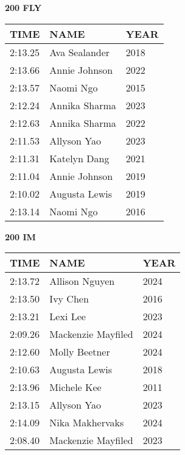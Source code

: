 \begin{table}[H]
\centering
\begin{minipage}[t]{0.48\textwidth}
\centering
\textbf{200 FLY}\\[0.1cm]
\begin{tabular}{@{}p{1.8cm}p{2.8cm}p{1.2cm}@{}}
\hline
    \textbf{TIME} & \textbf{NAME} & \textbf{YEAR} \\
\hline
    2:13.25 & Ava Sealander & 2018 \\
    2:13.66 & Annie Johnson & 2022 \\
    2:13.57 & Naomi Ngo & 2015 \\
    2:12.24 & Annika Sharma & 2023 \\
    2:12.63 & Annika Sharma & 2022 \\
    2:11.53 & Allyson Yao & 2023 \\
    2:11.31 & Katelyn Dang & 2021 \\
    2:11.04 & Annie Johnson & 2019 \\
    2:10.02 & Augusta Lewis & 2019 \\
    2:13.14 & Naomi Ngo & 2016 \\
\hline
\end{tabular}
\end{minipage}\hfill
\begin{minipage}[t]{0.48\textwidth}
\centering
\textbf{200 IM}\\[0.1cm]
\begin{tabular}{@{}p{1.8cm}p{2.8cm}p{1.2cm}@{}}
\hline
    \textbf{TIME} & \textbf{NAME} & \textbf{YEAR} \\
\hline
    2:13.72 & Allison Nguyen & 2024 \\
    2:13.50 & Ivy Chen & 2016 \\
    2:13.21 & Lexi Lee & 2023 \\
    2:09.26 & Mackenzie Mayfiled & 2024 \\
    2:12.60 & Molly Beetner & 2024 \\
    2:10.63 & Augusta Lewis & 2018 \\
    2:13.96 & Michele Kee & 2011 \\
    2:13.15 & Allyson Yao & 2023 \\
    2:14.09 & Nika Makhervaks & 2024 \\
    2:08.40 & Mackenzie Mayfiled & 2023 \\
\hline
\end{tabular}
\end{minipage}
\end{table}

